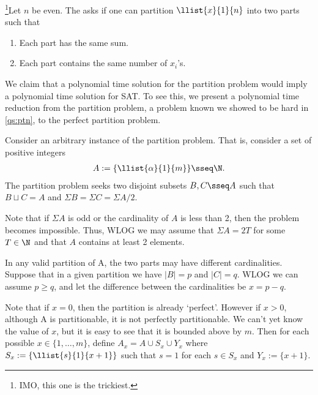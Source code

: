\documentclass{article}
\begin{document}

\begin{subexercise}
  \footnote[3]{IMO, this one is the trickiest.}Let \( n \) be even.
  The  asks if one can partition \( \llist{x}{1}{n} \) into two parts such that
  \begin{enumerate}[label=(\alph*)]
    \item Each part has the same sum.
    \item Each part contains the same number of \( x_i \)'s.
  \end{enumerate}
\end{subexercise}
\begin{solution}
  We claim that a polynomial time solution for the partition problem would imply a polynomial time solution for SAT.
  To see this, we present a polynomial time reduction from the partition problem, a problem known we showed to be hard in \ref{qs:ptn}, to the perfect partition problem.

  Consider an arbitrary instance of the partition problem.
  That is, consider a set of positive integers \begin{align*}
    A := \{\llist{\alpha}{1}{m}\} \sseq \N.
  \end{align*}
  The partition problem seeks two disjoint subsets \( B,C\sseq A \) such that \( B\sqcup C = A \) and \( \Sigma B = \Sigma C = \Sigma A / 2 \).

  Note that if \( \Sigma A \) is odd or the cardinality of \( A \) is less than 2, then the problem becomes impossible.
  Thus, WLOG we may assume that \( \Sigma A = 2T \) for some \( T\in \N \) and that \( A \) contains at least 2 elements.

  In any valid partition of A, the two parts may have different cardinalities.
  Suppose that in a given partition we have \( |B| = p \) and \( |C| = q \).
  WLOG we can assume \( p \geq q \), and let the difference between the cardinalities be \( x = p-q \).

  Note that if \( x = 0 \), then the partition is already `perfect'.
  However if \( x > 0 \), although A is partitionable, it is not perfectly partitionable.
  We can't yet know the value of \( x \), but it is easy to see that it is bounded above by \( m \).
  Then for each possible \( x\in \{1,\ldots,m\} \), define \( A_x = A \cup S_x \cup Y_x \) where \( S_x := \{\llist{s}{1}{x+1} \} \) such that \( s = 1 \) for each \( s\in S_x \) and \( Y_x := \{x+1\} \).


\end{solution}
\end{document}

